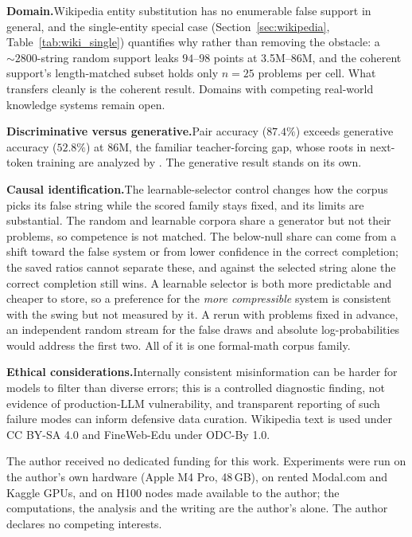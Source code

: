 \documentclass{article}
\begin{document}
\textbf{Domain.}\quad Wikipedia entity substitution has no enumerable false support in general, and the single-entity special case (Section~\ref{sec:wikipedia}, Table~\ref{tab:wiki_single}) quantifies why rather than removing the obstacle: a ${\sim}2800$-string random support leaks $94$--$98$ points at 3.5M--86M, and the coherent support's length-matched subset holds only $n{=}25$ problems per cell. What transfers cleanly is the coherent result. Domains with competing real-world knowledge systems remain open.

\textbf{Discriminative versus generative.}\quad Pair accuracy ($87.4\%$) exceeds generative accuracy ($52.8\%$) at 86M, the familiar teacher-forcing gap, whose roots in next-token training are analyzed by \citet{bachmann2024pitfalls}. The generative result stands on its own.

\textbf{Causal identification.}\quad The learnable-selector control changes how the corpus picks its false string while the scored family stays fixed, and its limits are substantial. The random and learnable corpora share a generator but not their problems, so competence is not matched. The below-null share can come from a shift toward the false system or from lower confidence in the correct completion; the saved ratios cannot separate these, and against the selected string alone the correct completion still wins. A learnable selector is both more predictable and cheaper to store, so a preference for the \emph{more compressible} system is consistent with the swing but not measured by it. A rerun with problems fixed in advance, an independent random stream for the false draws and absolute log-probabilities would address the first two. All of it is one formal-math corpus family.

\textbf{Ethical considerations.}\quad Internally consistent misinformation can be harder for models to filter than diverse errors; this is a controlled diagnostic finding, not evidence of production-LLM vulnerability, and transparent reporting of such failure modes can inform defensive data curation. Wikipedia text is used under CC BY-SA 4.0 and FineWeb-Edu under ODC-By 1.0.

\begin{ack}
The author received no dedicated funding for this work. Experiments were run on the author's own hardware (Apple M4 Pro, 48\,GB), on rented Modal.com and Kaggle GPUs, and on H100 nodes made available to the author; the computations, the analysis and the writing are the author's alone. The author declares no competing interests.
\end{ack}
\end{document}
